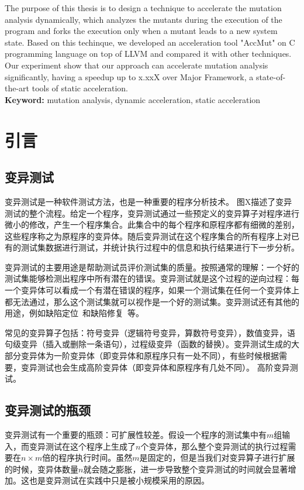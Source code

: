 \documentclass[nofonts]{ctexrep}
\begin{document}
The purpose of this thesis is to design a technique to accelerate the mutation analysis dynamically, which analyzes the mutants during the execution of the program and forks the execution only when a mutant leads to a new system state. Based on this techinque, we developed an acceleration tool "AccMut" on C programming language on top of LLVM and compared it with other techniques. Our experiment show that our approach can accelerate mutation analysis significantly, having a speedup up to x.xxX over Major Framework, a state-of-the-art tools of static acceleration. \\

\textbf{Keyword:} mutation analysis, dynamic acceleration, static acceleration
\tableofcontents


\chapter{引言}
\section{变异测试}
变异测试是一种软件测试方法，也是一种重要的程序分析技术\cite{demillo1978hints,hamlet1977testing}。
图X描述了变异测试的整个流程。给定一个程序，变异测试通过一些预定义的变异算子对程序进行微小的修改，产生一个程序集合。此集合中的每个程序和原程序都有细微的差别，这些程序称之为原程序的变异体。随后变异测试在这个程序集合的所有程序上对已有的测试集数据进行测试，并统计执行过程中的信息和执行结果进行下一步分析。


变异测试的主要用途是帮助测试员评价测试集的质量\cite{jia2011analysis}。按照通常的理解：一个好的测试集能够检测出程序中所有潜在的错误。变异测试就是这个过程的逆向过程：每一个变异体可以看成一个有潜在错误的程序，如果一个测试集在任何一个变异体上都无法通过，那么这个测试集就可以视作是一个好的测试集。变异测试还有其他的用途，例如缺陷定位~\cite{papadakis2012using,moon2014ask,zhang2013injecting}和缺陷修复~\cite{GenProg,PAR,RSRepair,AE}等。

常见的变异算子包括：符号变异（逻辑符号变异，算数符号变异），数值变异，语句级变异（插入或删除一条语句），过程级变异（函数的替换）。变异测试生成的大部分变异体为一阶变异体（即变异体和原程序只有一处不同），有些时候根据需要，变异测试也会生成高阶变异体（即变异体和原程序有几处不同）。
高阶变异测试。

\section{变异测试的瓶颈}
变异测试有一个重要的瓶颈：可扩展性较差。假设一个程序的测试集中有$m$组输入，而变异测试在这个程序上生成了$n$个变异体，那么整个变异测试的执行过程需要在$n\times m$倍的程序执行时间。虽然$m$是固定的，但是当我们对变异算子进行扩展的时候，变异体数量$n$就会随之膨胀，进一步导致整个变异测试的时间就会显著增加。这也是变异测试在实践中只是被小规模采用的原因。
\end{document}
